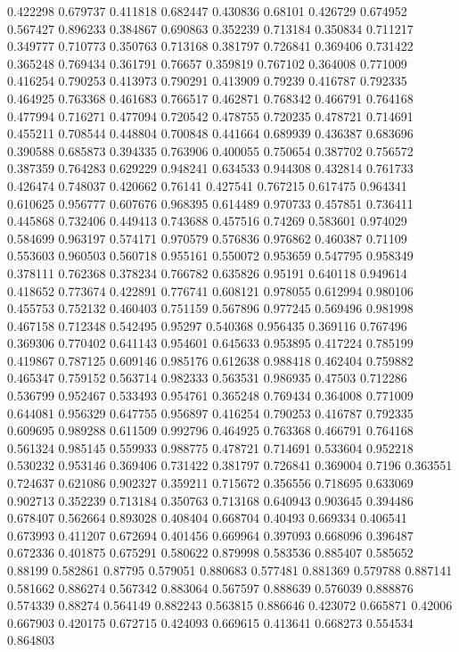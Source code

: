 0.422298 0.679737
0.411818 0.682447
0.430836 0.68101
0.426729 0.674952
0.567427 0.896233
0.384867 0.690863
0.352239 0.713184
0.350834 0.711217
0.349777 0.710773
0.350763 0.713168
0.381797 0.726841
0.369406 0.731422
0.365248 0.769434
0.361791 0.76657
0.359819 0.767102
0.364008 0.771009
0.416254 0.790253
0.413973 0.790291
0.413909 0.79239
0.416787 0.792335
0.464925 0.763368
0.461683 0.766517
0.462871 0.768342
0.466791 0.764168
0.477994 0.716271
0.477094 0.720542
0.478755 0.720235
0.478721 0.714691
0.455211 0.708544
0.448804 0.700848
0.441664 0.689939
0.436387 0.683696
0.390588 0.685873
0.394335 0.763906
0.400055 0.750654
0.387702 0.756572
0.387359 0.764283
0.629229 0.948241
0.634533 0.944308
0.432814 0.761733
0.426474 0.748037
0.420662 0.76141
0.427541 0.767215
0.617475 0.964341
0.610625 0.956777
0.607676 0.968395
0.614489 0.970733
0.457851 0.736411
0.445868 0.732406
0.449413 0.743688
0.457516 0.74269
0.583601 0.974029
0.584699 0.963197
0.574171 0.970579
0.576836 0.976862
0.460387 0.71109
0.553603 0.960503
0.560718 0.955161
0.550072 0.953659
0.547795 0.958349
0.378111 0.762368
0.378234 0.766782
0.635826 0.95191
0.640118 0.949614
0.418652 0.773674
0.422891 0.776741
0.608121 0.978055
0.612994 0.980106
0.455753 0.752132
0.460403 0.751159
0.567896 0.977245
0.569496 0.981998
0.467158 0.712348
0.542495 0.95297
0.540368 0.956435
0.369116 0.767496
0.369306 0.770402
0.641143 0.954601
0.645633 0.953895
0.417224 0.785199
0.419867 0.787125
0.609146 0.985176
0.612638 0.988418
0.462404 0.759882
0.465347 0.759152
0.563714 0.982333
0.563531 0.986935
0.47503 0.712286
0.536799 0.952467
0.533493 0.954761
0.365248 0.769434
0.364008 0.771009
0.644081 0.956329
0.647755 0.956897
0.416254 0.790253
0.416787 0.792335
0.609695 0.989288
0.611509 0.992796
0.464925 0.763368
0.466791 0.764168
0.561324 0.985145
0.559933 0.988775
0.478721 0.714691
0.533604 0.952218
0.530232 0.953146
0.369406 0.731422
0.381797 0.726841
0.369004 0.7196
0.363551 0.724637
0.621086 0.902327
0.359211 0.715672
0.356556 0.718695
0.633069 0.902713
0.352239 0.713184
0.350763 0.713168
0.640943 0.903645
0.394486 0.678407
0.562664 0.893028
0.408404 0.668704
0.40493 0.669334
0.406541 0.673993
0.411207 0.672694
0.401456 0.669964
0.397093 0.668096
0.396487 0.672336
0.401875 0.675291
0.580622 0.879998
0.583536 0.885407
0.585652 0.88199
0.582861 0.87795
0.579051 0.880683
0.577481 0.881369
0.579788 0.887141
0.581662 0.886274
0.567342 0.883064
0.567597 0.888639
0.576039 0.888876
0.574339 0.88274
0.564149 0.882243
0.563815 0.886646
0.423072 0.665871
0.42006 0.667903
0.420175 0.672715
0.424093 0.669615
0.413641 0.668273
0.554534 0.864803
